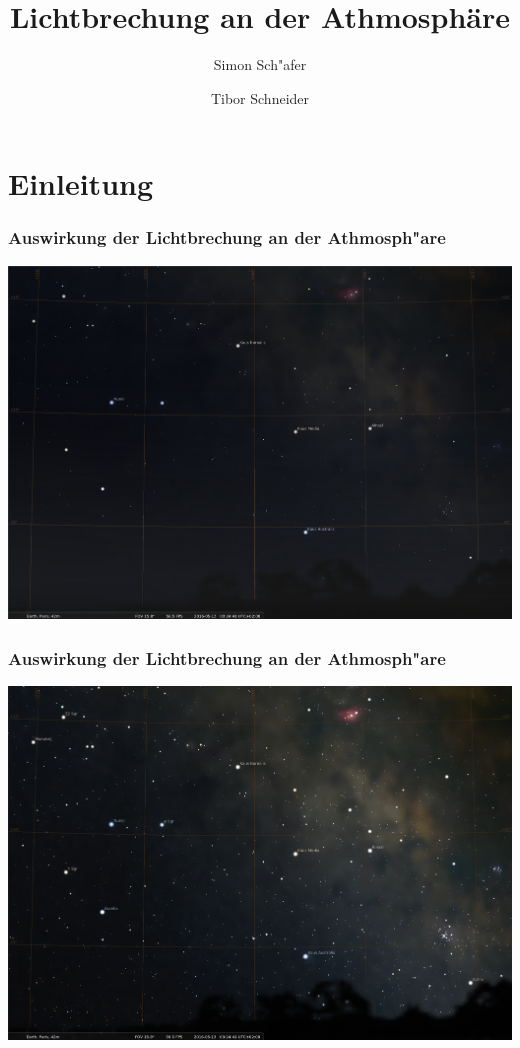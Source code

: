 \documentclass{beamer}
\title[Licht] %
{Lichtbrechung an der Athmosphäre}
\author[Schaefer, Schneider] %
{Simon Sch"afer \and Tibor Schneider}
\institute[hsr] %
{
  HSR Hochschule f"ur Technik Rapperswil
}
\begin{document}
  \frame{\titlepage}  

  
  \section{Einleitung}
  \begin{frame}
    \frametitle{Auswirkung der Lichtbrechung an der Athmosph"are}
    \includegraphics[width=\textwidth, trim={0 1cm 0 0}, clip]{images/stellarium_athmosphere}
  \end{frame} 
  \begin{frame}
    \frametitle{Auswirkung der Lichtbrechung an der Athmosph"are}
    \includegraphics[width=\textwidth, trim={0 1cm 0 0}, clip]{images/stellarium_no_athmosphere}
  \end{frame} 
  
\end{document}
